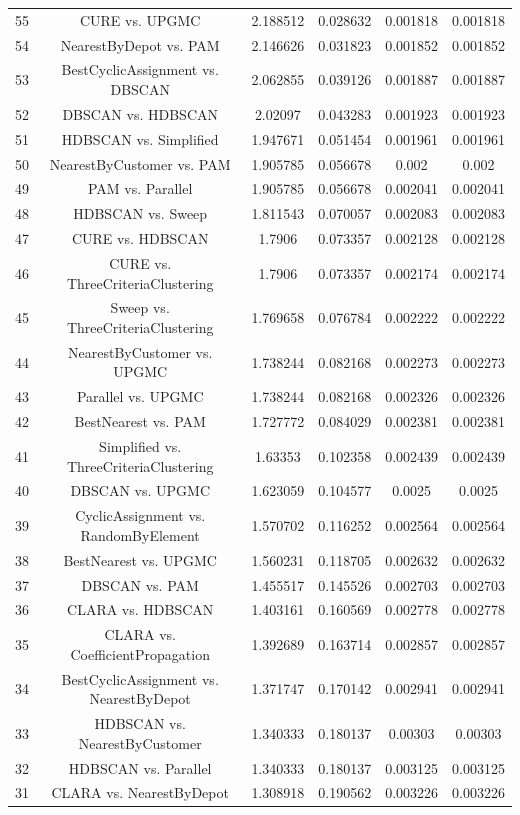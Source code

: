 \documentclass[a4paper,10pt]{article}
\begin{document}
\begin{landscape}
\begin{table}[!htp]
\begin{tabular}{cccccc}
55&CURE vs. UPGMC&2.188512&0.028632&0.001818&0.001818\\
54&NearestByDepot vs. PAM&2.146626&0.031823&0.001852&0.001852\\
53&BestCyclicAssignment vs. DBSCAN&2.062855&0.039126&0.001887&0.001887\\
52&DBSCAN vs. HDBSCAN&2.02097&0.043283&0.001923&0.001923\\
51&HDBSCAN vs. Simplified&1.947671&0.051454&0.001961&0.001961\\
50&NearestByCustomer vs. PAM&1.905785&0.056678&0.002&0.002\\
49&PAM vs. Parallel&1.905785&0.056678&0.002041&0.002041\\
48&HDBSCAN vs. Sweep&1.811543&0.070057&0.002083&0.002083\\
47&CURE vs. HDBSCAN&1.7906&0.073357&0.002128&0.002128\\
46&CURE vs. ThreeCriteriaClustering&1.7906&0.073357&0.002174&0.002174\\
45&Sweep vs. ThreeCriteriaClustering&1.769658&0.076784&0.002222&0.002222\\
44&NearestByCustomer vs. UPGMC&1.738244&0.082168&0.002273&0.002273\\
43&Parallel vs. UPGMC&1.738244&0.082168&0.002326&0.002326\\
42&BestNearest vs. PAM&1.727772&0.084029&0.002381&0.002381\\
41&Simplified vs. ThreeCriteriaClustering&1.63353&0.102358&0.002439&0.002439\\
40&DBSCAN vs. UPGMC&1.623059&0.104577&0.0025&0.0025\\
39&CyclicAssignment vs. RandomByElement&1.570702&0.116252&0.002564&0.002564\\
38&BestNearest vs. UPGMC&1.560231&0.118705&0.002632&0.002632\\
37&DBSCAN vs. PAM&1.455517&0.145526&0.002703&0.002703\\
36&CLARA vs. HDBSCAN&1.403161&0.160569&0.002778&0.002778\\
35&CLARA vs. CoefficientPropagation&1.392689&0.163714&0.002857&0.002857\\
34&BestCyclicAssignment vs. NearestByDepot&1.371747&0.170142&0.002941&0.002941\\
33&HDBSCAN vs. NearestByCustomer&1.340333&0.180137&0.00303&0.00303\\
32&HDBSCAN vs. Parallel&1.340333&0.180137&0.003125&0.003125\\
31&CLARA vs. NearestByDepot&1.308918&0.190562&0.003226&0.003226\\

\end{tabular}
\end{table}
\end{landscape}
\end{document}
